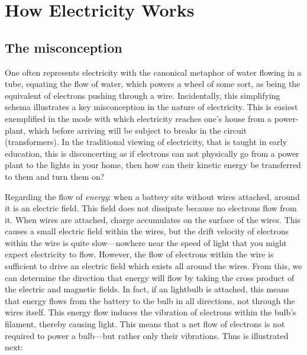 \documentclass[12pt]{report}
\begin{document}
\section{How Electricity Works} 
\subsection{The misconception} One often represents electricity with the canonical metaphor of water flowing in a tube, equating the flow of water, which powers a wheel of some sort, as being the equivalent of electrons pushing through a wire. Incidentally, this simplifying schema illustrates a key misconception in the nature of electricity. This is easiest exemplified in the mode with which electricity reaches one's house from a power-plant, which before arriving will be subject to breaks in the circuit (transformers). In the traditional viewing of electricity, that is taught in early education, this is disconcerting as if electrons can not physically go from a power plant to the lights in your home, then how can their kinetic energy be transferred to them and turn them on?\newline

Regarding the flow of \textit{energy}: when a battery sits without wires attached, around it is an electric field. This field does not dissipate because no electrons flow from it. When wires are attached, charge accumulates on the surface of the wires. This causes a small electric field within the wires, but the drift velocity of electrons within the wire is quite slow---nowhere near the speed of light that you might expect electricity to flow. However, the flow of electrons within the wire is sufficient to drive an electric field which exists all around the wires. From this, we can determine the direction that energy will flow by taking the cross product of the electric and magnetic fields. In fact, if an lightbulb is attached, this means that energy flows from the battery to the bulb in all directions, not through the wires itself. This energy flow induces the vibration of electrons within the bulb's filament, thereby causing light. This means that a net flow of electrons is not required to power a bulb---but rather only their vibrations. Thus is illustrated next:\newline 
\end{document}
